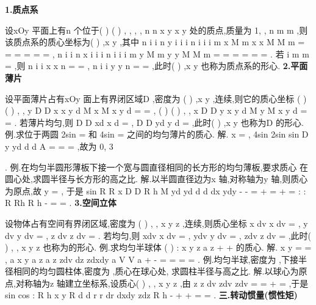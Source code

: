 {\bfseries \textcolor{lyred}{1.质点系}}

设xOy 平面上有n 个位于(
)
(
)
,
,
,
,
n
n
x y
x
y
\Lambda 
处的质点,质量为
1,
,
n
m
m
\Lambda 
,则 
该质点系的\textcolor{lyred}{质心}坐标为(
)
,x y ,其中 
n
i
i
n
y
i
i
i
n
i
i
i
m x
M
m
x
x
M
M
m
=
=
=
=
=
=
\sum 
\sum 
\sum 
,
n
i
i
n
x
i
i
i
n
i
i
i
m y
M
m
y
y
M
M
m
=
=
=
=
=
=
\sum 
\sum 
\sum 
. 
若
i
m
m
=
,则
n
i
i
x
x
n
=
=\sum 
,
n
i
i
y
y
n
=
=\sum 
,此时(
)
,x y 也称为质点系的\textcolor{lyred}{形心}. 
{\bfseries \textcolor{lyred}{2.平面薄片}}

设平面薄片占有xOy 面上有界闭区域D ,密度为
(
)
,x y
\mu 
,连续,则它的\textcolor{lyred}{质心}坐标\textcolor{lyred}{ }
(
)
(
)
,
,
y
D
D
x
x y d
M
x
M
x y d
\mu 
\sigma 
\mu 
\sigma 
=
=\int \int 
\int \int 
,
(
)
(
)
,
,
x
D
D
y
x y d
M
y
M
x y d
\mu 
\sigma 
\mu 
\sigma 
=
=\int \int 
\int \int 
. 
若薄片均匀,则
D
D
xd
x
d
\sigma 
\sigma 
=\int \int 
\int \int 
,
D
D
yd
y
d
\sigma 
\sigma 
=\int \int 
\int \int 
,此时(
)
,x y 也称为D 的\textcolor{lyred}{形心}. 
\textcolor{lyred}{例}.求位于两圆
2sin
\rho 
\theta 
=
和
4sin
\rho 
\theta 
=
之间的均匀薄片的质心. 
解.
x =
,
4sin
2sin
sin
D
y
yd
d
d
A
\pi 
\theta 
\theta 
\sigma 
\theta 
\rho 
\theta \rho \rho 
\pi 
=
=
\cdots 
=
\int \int 
\int 
\int 
,故为
0, 3






. 
\textcolor{lyred}{例}.在均匀半圆形薄板下接一个宽与圆直径相同的长方形的均匀薄板,要求质心 
在圆心处,求圆半径与长方形的高之比. 
解.以半圆直径边为x 轴,对称轴为y 轴,则质心为原点,故
y =
, 
于是
sin
R
R
x
D
D
R
h
M
yd
yd
d
d
dx
ydy
\pi 
\mu 
\sigma 
\mu 
\sigma 
\mu 
\theta \rho 
\theta \rho \rho 
\mu 
-
-
=
+
=
\cdots 
+
=
\Rightarrow 
\int \int 
\int \int 
\int 
\int 
\int 
\int 
:
:
R
Rh
R h
\mu 
\mu 
\mu 
\mu 
-
=
\Rightarrow 
=
. 
{\bfseries \textcolor{lyred}{3.空间立体}}

设物体占有空间有界闭区域\Omega ,密度为
(
)
, ,
x y z
\rho 
,连续,则\textcolor{lyred}{质心}坐标 
x dv
x
dv
\rho 
\rho 
\Omega 
\Omega 
=\int \int \int 
\int \int \int 
,
y dv
y
dv
\rho 
\rho 
\Omega 
\Omega 
=\int \int \int 
\int \int \int 
,
z dv
z
dv
\rho 
\rho 
\Omega 
\Omega 
=\int \int \int 
\int \int \int 
. 
若\Omega 均匀,则
xdv
x
dv
\Omega 
\Omega 
=\int \int \int 
\int \int \int 
,
ydv
y
dv
\Omega 
\Omega 
=\int \int \int 
\int \int \int 
,
zdv
z
dv
\Omega 
\Omega 
=\int \int \int 
\int \int \int 
,此时(
)
, ,
x y z 也称为\Omega 的\textcolor{lyred}{形心}. 
\textcolor{lyred}{例}.求均匀半球体
(
)
:
x
y
z
a
z
\Omega 
+
+
\le 
\ge 
的质心. 
解.
x
y
=
=
,
a
x
y
a
z
a
z
zdv
dz
zdxdy
a
V
V
a
\pi 
\pi 
\Omega 
+
\le 
-
=
=
=
\cdots 
=
\int \int \int 
\int 
\int \int 
. 
\textcolor{lyred}{例}.均匀半球,密度为
\rho ,下接半径相同的均匀圆柱体,密度为
\rho ,质心在球心处, 
求圆柱半径与高之比. 
解.以球心为原点,对称轴为z 轴建立坐标系,设质心(
)
, ,
x y z ,由 
z
z dv
zdv
zdv
\rho 
\rho 
\rho 
\Omega 
\Omega 
\Omega 
=
\Rightarrow 
=
\Rightarrow 
+
=
\int \int \int 
\int \int \int 
\int \int \int 
,于是 
sin
cos
:
R
h
x
y
R
d
d
r
r dr
dxdy
zdz
R h
\pi 
\pi 
\rho 
\rho 
\theta 
\varphi \varphi 
\varphi 
\rho 
\rho 
-
+
\le 
\cdots 
+
=
\Rightarrow 
=
\int 
\int 
\int 
\int \int 
\int 
. 
\vspace{4pt}
{\bfseries \textcolor{lyred}{三.转动惯量(惯性矩)}}

